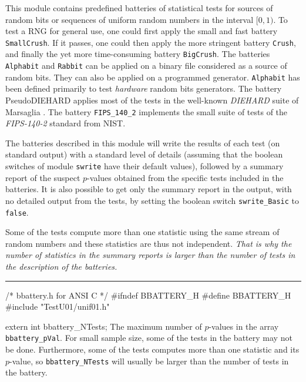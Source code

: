 
This module contains predefined batteries of statistical tests for
sources of random bits or sequences of uniform random numbers in
the interval $[0, 1)$.
To test a RNG for general use, one could first apply the
small and fast battery {\tt SmallCrush}.
If it passes, one could then apply the more stringent battery
{\tt Crush}, and finally the yet more time-consuming
battery {\tt BigCrush}.
The batteries {\tt Alphabit} and {\tt Rabbit} can be applied on a binary
file considered as a source of random bits. They can also be applied
on a programmed generator.  {\tt Alphabit} has been defined primarily to test
{\it hardware} random bits generators.
The battery {PseudoDIEHARD} applies most of the tests in
the well-known {\it DIEHARD\/} suite of Marsaglia \cite{rMAR96b}.
The battery {\tt FIPS\_140\_2} implements the small suite of tests
of the {\it FIPS-140-2} standard from NIST.

The batteries described in this module  will write the results of each test
(on standard output) with a standard level of details (assuming that the
 boolean switches of module {\tt swrite} have their default values),
followed by a summary  report of the suspect $p$-values obtained from the
 specific tests included in the batteries.
It is also possible to get only the summary report in the output,
with no detailed output from the tests,
by setting the boolean switch {\tt swrite\_Basic} to {\tt false}.

Some of the tests compute more than one statistic using the same stream of
random numbers and these statistics are thus not independent.
\emph{That is why the number of statistics in the summary reports is larger than
the number of tests in the description of the batteries.}

\bigskip
\hrule
\code\hide
/* bbattery.h for ANSI C */
#ifndef BBATTERY_H
#define BBATTERY_H
\endhide
#include "TestU01/unif01.h"


extern int bbattery_NTests;
\endcode
  \tab The maximum number of $p$-values in the array {\tt bbattery\_pVal}.
  For small sample size, some of the tests in the battery may not be done.
  Furthermore, some of the tests computes more than one statistic and
  its $p$-value, so {\tt bbattery\_NTests} will usually be larger than
  the number of tests in the battery.
  \endtab
\code


